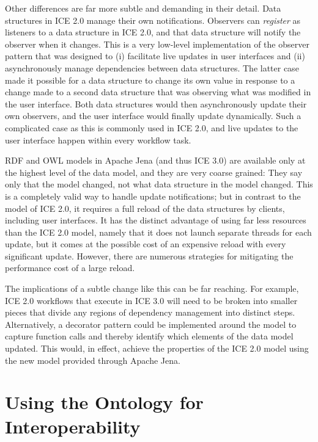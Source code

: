 Other differences are far more subtle and demanding in their detail. Data
structures in ICE 2.0 manage their own notifications. Observers can
\textit{register} as listeners to a data structure in ICE 2.0, and that data
structure will notify the observer when it changes. This is a very low-level
implementation of the observer pattern that was designed
to (i) facilitate live updates in user interfaces and (ii) asynchronously manage
dependencies between data structures. The latter case made it possible for a
data structure to change its own value in response to a change made to a second
data structure that was observing what was modified in the user interface. Both
data structures would then asynchronously update their own observers, and the
user interface would finally update dynamically. Such a complicated case as
this is commonly used in ICE 2.0, and live updates to the user interface happen
within every workflow task.

RDF and OWL models in Apache Jena (and thus ICE 3.0) are available only at the
highest level of the data model, and they are very coarse grained: They say only
that the model changed, not what data structure in the model changed. This is a
completely valid way to handle update notifications; but in contrast to the
model of ICE 2.0, it requires a full reload of the data structures by clients,
including user interfaces. It has the distinct advantage of using far less
resources than the ICE 2.0 model, namely that it does not launch separate
threads for each update, but it comes at the possible cost of an expensive
reload with every significant update. However, there are numerous strategies
for mitigating the performance cost of a large reload.

The implications of a subtle change like this can be far reaching. For example,
ICE 2.0 workflows that execute in ICE 3.0 will need to be broken into smaller
pieces that divide any regions of dependency management into distinct steps.
Alternatively, a decorator pattern could be implemented around the model to
capture function calls and thereby identify which elements of the data model
updated. This would, in effect, achieve the properties of the ICE 2.0 model
using the new model provided through Apache Jena.

\section{Using the Ontology for Interoperability}

